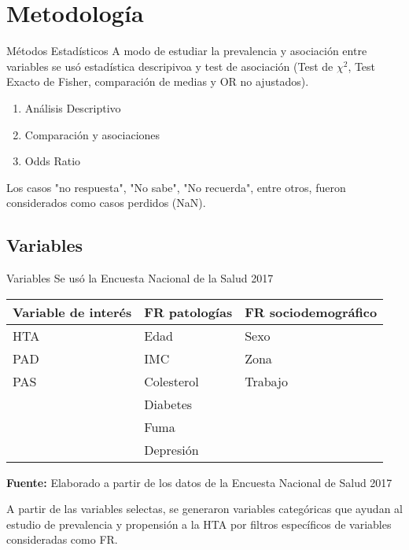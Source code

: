 \documentclass[aspectratio=169]{beamer}
\begin{document}
\section{Metodología}
\begin{frame}{Métodos Estadísticos}
A modo de estudiar la prevalencia y asociación entre variables se usó estadística descripivoa y test de asociación (Test de $\chi^2$, Test Exacto de Fisher, comparación de medias y OR no ajustados). \vfill
    \begin{enumerate}
        \item Análisis Descriptivo
        \item Comparación y asociaciones
        \item Odds Ratio
    \end{enumerate}
    \vfill
    Los casos "no respuesta", "No sabe", "No recuerda", entre otros, fueron considerados como casos perdidos (NaN).
\end{frame}


\subsection*{Variables}
\begin{frame}{Variables}
    Se usó la Encuesta Nacional de la Salud 2017
    
    \begin{table}
        \centering
        \begin{tabular}{l l l}
        \toprule
             Variable de interés & FR patologías & FR sociodemográfico\\
        \midrule
             HTA & Edad & Sexo\\
             PAD & IMC & Zona\\
             PAS & Colesterol & Trabajo\\
             & Diabetes &\\
             & Fuma &\\
             & Depresión &\\
             \toprule
        \end{tabular}
        \vspace{1ex}
        \label{tab:my_label}
        
     {\raggedright \small \textbf{Fuente:} Elaborado a partir de los datos de la Encuesta Nacional de Salud 2017 \par}
    \end{table}
A partir de las variables selectas, se generaron variables categóricas que ayudan al estudio de prevalencia y propensión a la HTA por filtros específicos de variables consideradas como FR.
\end{frame}
\end{document}
